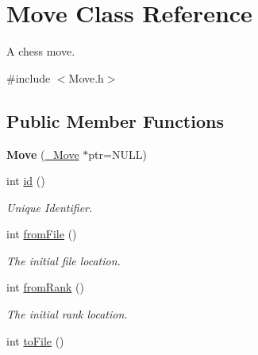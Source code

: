 \hypertarget{classMove}{
\section{Move Class Reference}
\label{classMove}
}


A chess move.  




{\ttfamily \#include $<$Move.h$>$}

\subsection*{Public Member Functions}
\begin{DoxyCompactItemize}
\item 
\hypertarget{classMove_a3da5b65d7b003f16db2a26588591d606}{
{\bfseries Move} (\hyperlink{struct__Move}{\_\-Move} $\ast$ptr=NULL)}
\label{classMove_a3da5b65d7b003f16db2a26588591d606}

\item 
\hypertarget{classMove_a2ded50b930f828205dc906ce422a92eb}{
int \hyperlink{classMove_a2ded50b930f828205dc906ce422a92eb}{id} ()}
\label{classMove_a2ded50b930f828205dc906ce422a92eb}

\begin{DoxyCompactList}\small\item\em Unique Identifier. \item\end{DoxyCompactList}\item 
\hypertarget{classMove_a853c1ea4e55284fbeee28aee10f2e1c3}{
int \hyperlink{classMove_a853c1ea4e55284fbeee28aee10f2e1c3}{fromFile} ()}
\label{classMove_a853c1ea4e55284fbeee28aee10f2e1c3}

\begin{DoxyCompactList}\small\item\em The initial file location. \item\end{DoxyCompactList}\item 
\hypertarget{classMove_aac11d5dbdb459defce575a9baf052a7d}{
int \hyperlink{classMove_aac11d5dbdb459defce575a9baf052a7d}{fromRank} ()}
\label{classMove_aac11d5dbdb459defce575a9baf052a7d}

\begin{DoxyCompactList}\small\item\em The initial rank location. \item\end{DoxyCompactList}\item 
\hypertarget{classMove_a488251cba4660cf81a1b1fd6aea0ce37}{
int \hyperlink{classMove_a488251cba4660cf81a1b1fd6aea0ce37}{toFile} ()}
\label{classMove_a488251cba4660cf81a1b1fd6aea0ce37}


\end{DoxyCompactItemize}
